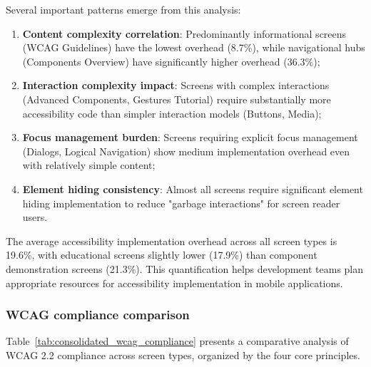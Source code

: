 Several important patterns emerge from this analysis:

\begin{enumerate}
    \item \textbf{Content complexity correlation}: Predominantly informational screens (WCAG Guidelines) have the lowest overhead (8.7\%), while navigational hubs (Components Overview) have significantly higher overhead (36.3\%);
    
    \item \textbf{Interaction complexity impact}: Screens with complex interactions (Advanced Components, Gestures Tutorial) require substantially more accessibility code than simpler interaction models (Buttons, Media);
    
    \item \textbf{Focus management burden}: Screens requiring explicit focus management (Dialogs, Logical Navigation) show medium implementation overhead even with relatively simple content;
    
    \item \textbf{Element hiding consistency}: Almost all screens require significant element hiding implementation to reduce "garbage interactions" for screen reader users.
\end{enumerate}

The average accessibility implementation overhead across all screen types is 19.6\%, with educational screens slightly lower (17.9\%) than component demonstration screens (21.3\%). This quantification helps development teams plan appropriate resources for accessibility implementation in mobile applications.

\subsubsection{WCAG compliance comparison}

Table~\ref{tab:consolidated_wcag_compliance} presents a comparative analysis of WCAG 2.2 compliance across screen types, organized by the four core principles.

